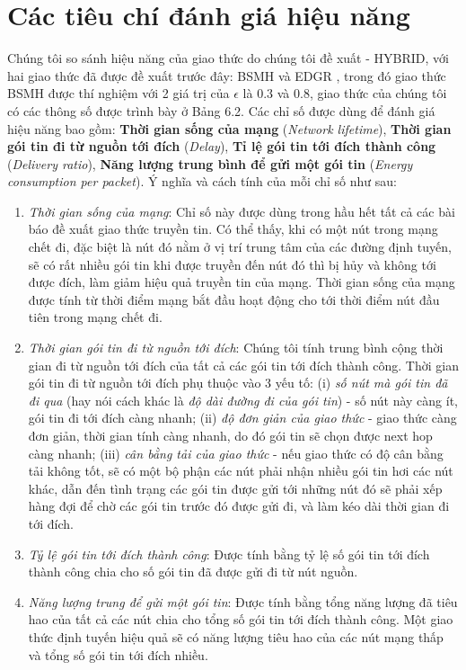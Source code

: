 \documentclass[12pt]{report}
\begin{document}
\section{Các tiêu chí đánh giá hiệu năng}
\label{sec:5.2}
Chúng tôi so sánh hiệu năng của giao thức do chúng tôi đề xuất - HYBRID, với hai giao thức đã được đề xuất trước đây: BSMH \cite{bsmh} và EDGR \cite{edgr}, trong đó giao thức BSMH được thí nghiệm với 2 giá trị của $\epsilon$ là $ 0.3 $ và $ 0.8 $, giao thức của chúng tôi có các thông số được trình bày ở Bảng 6.2. Các chỉ số được dùng để đánh giá hiệu năng bao gồm: \textbf{Thời gian sống của mạng} (\textit{Network lifetime}), \textbf{Thời gian gói tin đi từ nguồn tới đích} (\textit{Delay}), \textbf{Tỉ lệ gói tin tới đích thành công} (\textit{Delivery ratio}), \textbf{Năng lượng trung bình để gửi một gói tin} (\textit{Energy consumption per packet}). Ý nghĩa và cách tính của mỗi chỉ số như sau:
\begin{enumerate}
\item \textit{Thời gian sống của mạng}: Chỉ số này được dùng trong hầu hết tất cả các bài báo đề xuất giao thức truyền tin. Có thể thấy, khi có một nút trong mạng chết đi, đặc biệt là nút đó nằm ở vị trí trung tâm của các đường định tuyến, sẽ có rất nhiều gói tin khi được truyền đến nút đó thì bị hủy và không tới được đích, làm giảm hiệu quả truyền tin của mạng. Thời gian sống của mạng được tính từ thời điểm mạng bắt đầu hoạt động cho tới thời điểm nút đầu tiên trong mạng chết đi.
\item \textit{Thời gian gói tin đi từ nguồn tới đích}: Chúng tôi tính trung bình cộng thời gian đi từ nguồn tới đích của tất cả các gói tin tới đích thành công. Thời gian gói tin đi từ nguồn tới đích phụ thuộc vào 3 yếu tố: (i) \textit{số nút mà gói tin đã đi qua} (hay nói cách khác là \textit{độ dài đường đi của gói tin}) - số nút này càng ít, gói tin đi tới đích càng nhanh; (ii) \textit{độ đơn giản của giao thức} - giao thức càng đơn giản, thời gian tính càng nhanh, do đó gói tin sẽ chọn được next hop càng nhanh; (iii) \textit{cân bằng tải của giao thức} - nếu giao thức có độ cân bằng tải không tốt, sẽ có một bộ phận các nút phải nhận nhiều gói tin hơi các nút khác, dẫn đến tình trạng các gói tin được gửi tới những nút đó sẽ phải xếp hàng đợi để chờ các gói tin trước đó được gửi đi, và làm kéo dài thời gian đi tới đích.
\item \textit{Tỷ lệ gói tin tới đích thành công}: Được tính bằng tỷ lệ số gói tin tới đích thành công chia cho số gói tin đã được gửi đi từ nút nguồn.
\item \textit{Năng lượng trung để gửi một gói tin}: Được tính bằng tổng năng lượng đã tiêu hao của tất cả các nút chia cho tổng số gói tin tới đích thành công. Một giao thức định tuyến hiệu quả sẽ có năng lượng tiêu hao của các nút mạng thấp và tổng số gói tin tới đích nhiều.
\end{enumerate}
\end{document}
